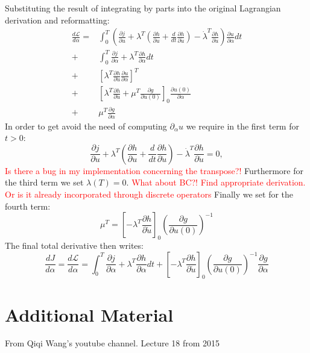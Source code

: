 \documentclass[10pt]{article}
\begin{document}
Substituting the result of integrating by parts into the original Lagrangian derivation and reformatting:
\begin{align}
\frac{d\mathcal{L}}{d \alpha} = 
&\int_{0}^{T}\left( \frac{\partial j}{\partial u} + \lambda^T \left(  \frac{\partial h}{\partial u} + \frac{d}{dt}\frac{\partial h}{\partial\dot u} \right) - \dot\lambda^T \frac{\partial h}{\partial\dot u} \right) \frac{\partial u}{\partial \alpha} dt \\
+&\int_{0}^{T}\frac{\partial j}{\partial \alpha} + \lambda^T \frac{\partial h}{\partial \alpha} dt \\
+& \left[ \lambda^T \frac{\partial h}{\partial\dot u} \frac{\partial u}{\partial \alpha} \right]^{T} \\
+& \left[ \lambda^T \frac{\partial h}{\partial\dot u} + \mu^T \frac{\partial g}{\partial u(0)} \right]_{0}  \frac{\partial u(0)}{\partial \alpha} \\
+& \mu^T\frac{\partial g}{\partial\alpha}
\end{align}
In order to get avoid the need of computing $\partial_{\alpha} u$ we require in the first term for $t>0$:
\begin{equation}
\frac{\partial j}{\partial u} + \lambda^T \left(  \frac{\partial h}{\partial u} + \frac{d}{dt}\frac{\partial h}{\partial\dot u} \right) - \dot\lambda^T \frac{\partial h}{\partial\dot u} = 0, 
\end{equation}
\textcolor{red}{Is there a bug in my implementation concerning the transpose?!}
Furthermore for the third term we set $\lambda(T)=0$. \textcolor{red}{What about BC?! Find appropriate derivation. Or is it already incorporated through discrete operators} Finally we set for the fourth term:
\begin{equation}
\mu^T = \left[- \lambda^T \frac{\partial h}{\partial\dot u} \right]_0 \left( \frac{\partial g}{\partial u(0)}\right)^{-1}
\end{equation}
The final total derivative then writes:
\begin{equation}
\frac{dJ}{d \alpha} =  \frac{d\mathcal{L}}{d \alpha} = \int_{0}^{T}\frac{\partial j}{\partial \alpha} + \lambda^T \frac{\partial h}{\partial \alpha} dt + \left[- \lambda^T \frac{\partial h}{\partial\dot u} \right]_0 \left( \frac{\partial g}{\partial u(0)}\right)^{-1} \frac{\partial g}{\partial\alpha}
\end{equation}


\section{Additional Material}
From Qiqi Wang's youtube channel. Lecture 18 from 2015
\end{document}

